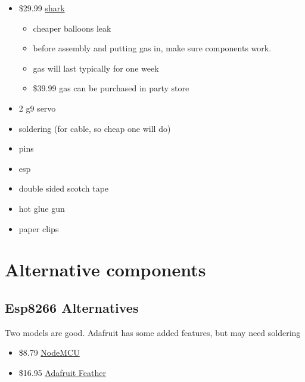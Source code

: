 \begin{itemize}

\item
  \$29.99
  \href{https://www.amazon.com/Swimmer-Inflatable-Flying-Replacement-Balloon/dp/B00658LN3E/ref=pd_bxgy_21_img_2?_encoding=UTF8\&pd_rd_i=B00658LN3E\&pd_rd_r=F71N2YCYE6Z0BCCEPQJC\&pd_rd_w=AwYab\&pd_rd_wg=rHTnv\&psc=1\&refRID=F71N2YCYE6Z0BCCEPQJC}{shark}

  \begin{itemize}

  \item
    cheaper balloons leak
  \item
    before assembly and putting gas in, make sure components work.
  \item
    gas will last typically for one week
  \item
    \$39.99 gas can be purchased in party store
  \end{itemize}
\item
  2 g9 servo
\item
  soldering (for cable, so cheap one will do)
\item
  pins
\item
  esp
\item
  double sided scotch tape
\item
  hot glue gun
\item
  paper clips
\end{itemize}

\section{Alternative components}\label{alternative-components}

\subsection{Esp8266 Alternatives}\label{esp8266-alternatives}

Two models are good. Adafruit has some added features, but may need
soldering

\begin{itemize}

\item
  \$8.79
  \href{https://www.amazon.com/HiLetgo-Version-NodeMCU-Internet-Development/dp/B010O1G1ES/ref=sr_1_3?s=electronics\&ie=UTF8\&qid=1499251149\&sr=1-3\&keywords=esp8266}{NodeMCU}
\item
  \$16.95 \href{https://www.adafruit.com/product/2821}{Adafruit Feather}
\end{itemize}

